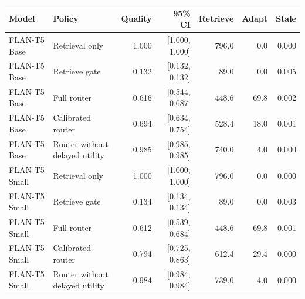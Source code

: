 \begin{tabular}{llrrrrr}
\toprule
Model & Policy & Quality & 95\% CI & Retrieve & Adapt & Stale \\
\midrule
FLAN-T5 Base & Retrieval only & 1.000 & [1.000, 1.000] & 796.0 & 0.0 & 0.000 \\
FLAN-T5 Base & Retrieve gate & 0.132 & [0.132, 0.132] & 89.0 & 0.0 & 0.005 \\
FLAN-T5 Base & Full router & 0.616 & [0.544, 0.687] & 448.6 & 69.8 & 0.002 \\
FLAN-T5 Base & Calibrated router & 0.694 & [0.634, 0.754] & 528.4 & 18.0 & 0.001 \\
FLAN-T5 Base & Router without delayed utility & 0.985 & [0.985, 0.985] & 740.0 & 4.0 & 0.000 \\
FLAN-T5 Small & Retrieval only & 1.000 & [1.000, 1.000] & 796.0 & 0.0 & 0.000 \\
FLAN-T5 Small & Retrieve gate & 0.134 & [0.134, 0.134] & 89.0 & 0.0 & 0.003 \\
FLAN-T5 Small & Full router & 0.612 & [0.539, 0.684] & 448.6 & 69.8 & 0.001 \\
FLAN-T5 Small & Calibrated router & 0.794 & [0.725, 0.863] & 612.4 & 29.4 & 0.000 \\
FLAN-T5 Small & Router without delayed utility & 0.984 & [0.984, 0.984] & 739.0 & 4.0 & 0.000 \\
\bottomrule
\end{tabular}
